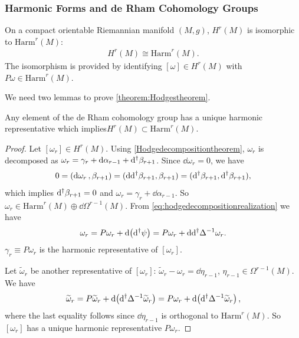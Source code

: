 \documentclass[10pt]{article}
\begin{document}
\subsubsection{Harmonic Forms and de Rham Cohomology Groups}
\begin{theorem}\label{theorem:Hodgestheorem}
    On a compact orientable Riemannian manifold $(M,g)$, $H^r(M)$ is isomorphic to $\mathrm{Harm}^r(M)$:
    \begin{align}
        H^r(M)\cong\mathrm{Harm}^r(M).
    \end{align}
    The isomorphism is provided by identifying $[\omega]\in H^r(M)$ with $P\omega\in\mathrm{Harm}^r(M)$.
\end{theorem}
We need two lemmas to prove \cref{theorem:Hodgestheorem}.
\begin{lemma}\label{lemma:Hodgestheorem1}
    Any element of the de Rham cohomology group has a unique harmonic representative which implies\snm $H^r(M)\subset\mathrm{Harm}^r(M)$.
\end{lemma}
\begin{proof}
    Let $[\omega_r]\in H^r(M)$.
    Using \cref{Hodgedecompositiontheorem}, $\omega_r$ is decomposed as $\omega_r=\gamma_r+\dd{\alpha_{r-1}}+\mathrm{d}^\dagger\beta_{r+1}$.
    Since $\dd{\omega_r}=0$, we have
    \begin{align}
        0=(\dd{\omega_r},\beta_{r+1})=(\mathrm{d}\mathrm{d}^\dagger\beta_{r+1},\beta_{r+1})=(\mathrm{d}^\dagger\beta_{r+1},\mathrm{d}^\dagger\beta_{r+1}),
    \end{align}
    which implies $\mathrm{d}^\dagger\beta_{r+1}=0$ and $\omega_r=\gamma_r+\dd{\alpha_{r-1}}$.
    So $\omega_r\in\mathrm{Harm}^r(M)\oplus\dd{\Omega^{r-1}(M)}$.
    From \eqref{eq:hodgedecompositionrealization} we have
    \begin{align}
        \omega_r=P\omega_r+\dd(\mathrm{d}^\dagger\psi)=P\omega_r+\mathrm{d}\mathrm{d}^\dagger\Delta^{-1}\omega_r.
    \end{align}
    $\gamma_r\equiv P\omega_r$ is the harmonic representative of $[\omega_r]$.

    Let $\widetilde{\omega}_r$ be another representative of $[\omega_r]$: $\widetilde{\omega}_r-\omega_r=\dd{\eta_{r-1}}$, $\eta_{r-1}\in\Omega^{r-1}(M)$.
    We have
    \begin{align}
        \widetilde{\omega}_r=P\widetilde{\omega}_r+\dd(\mathrm{d}^\dagger\Delta^{-1}\widetilde{\omega}_r)=P\omega_r+\dd(\mathrm{d}^\dagger\Delta^{-1}\widetilde{\omega}_r),
    \end{align}
    where the last equality follows since $\dd{\eta_{r-1}}$ is orthogonal to $\mathrm{Harm}^r(M)$.
    So $[\omega_r]$ has a unique harmonic representative $P\omega_r$.
\end{proof}
\end{document}

